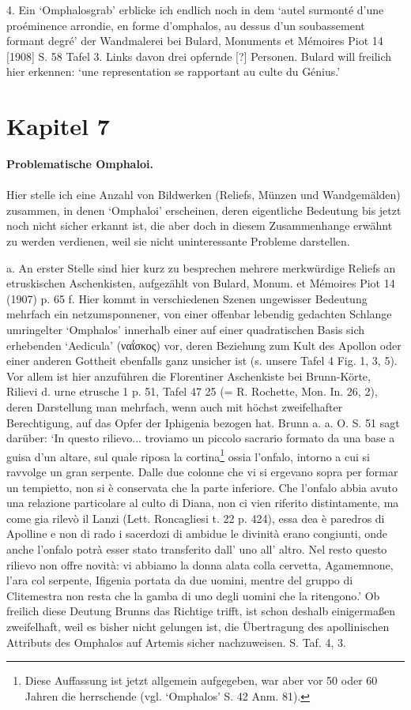\documentclass[a4paper, 11pt, oneside]{article}
\begin{document}
4. Ein `Omphalosgrab' erblicke ich endlich noch in dem `autel surmonté d'une proéminence arrondie, en forme d'omphalos, au dessus d'un soubassement formant degré' der Wandmalerei bei Bulard, Monuments et Mémoires Piot 14 [1908] S. 58 Tafel 3. Links davon drei opfernde [?] Personen. Bulard will freilich hier erkennen: `une representation se rapportant au culte du Génius.'
\clearpage
\section{Kapitel 7}
\begin{center}
\textbf{Problematische Omphaloi.}
\end{center}
\paragraph{}
Hier stelle ich eine Anzahl von Bildwerken (Reliefs, Münzen und Wandgemälden) zusammen, in denen `Omphaloi' erscheinen, deren eigentliche Bedeutung bis jetzt noch nicht sicher erkannt ist, die aber doch in diesem Zusammenhange erwähnt zu werden verdienen, weil sie nicht uninteressante Probleme darstellen.

a. An erster Stelle sind hier kurz zu besprechen mehrere merkwürdige Reliefs an etruskischen Aschenkisten, aufgezählt von Bulard, Monum. et Mémoires Piot 14 (1907) p. 65 f. Hier kommt in verschiedenen Szenen ungewisser Bedeutung mehrfach ein netzumsponnener, von einer offenbar lebendig gedachten Schlange umringelter `Omphalos' innerhalb einer auf einer quadratischen Basis sich erhebenden `Aedicula' (ναΐσκος) vor, deren Beziehung zum Kult des Apollon oder einer anderen Gottheit ebenfalls ganz unsicher ist (s. unsere Tafel 4 Fig. 1, 3, 5). Vor allem ist hier anzuführen die Florentiner Aschenkiste bei Brunn-Körte, Rilievi d. urne etrusche 1 p. 51, Tafel 47 25 (= R. Rochette, Mon. In. 26, 2), deren Darstellung man mehrfach, wenn auch mit höchst zweifelhafter Berechtigung, auf das Opfer der Iphigenia bezogen hat. Brunn a. a. O. S. 51 sagt darüber: `In questo rilievo... troviamo un piccolo sacrario formato da una base a guisa d'un altare, sul quale riposa la cortina\footnote{Diese Auffassung ist jetzt allgemein aufgegeben, war aber vor 50 oder 60 Jahren die herrschende (vgl. `Omphalos' S. 42 Anm. 81).} ossia l'onfalo, intorno a cui si ravvolge un gran serpente. Dalle due colonne che vi si ergevano sopra per formar un tempietto, non si è conservata che la parte inferiore. Che l'onfalo abbia avuto una relazione particolare al culto di Diana, non ci vien riferito distintamente, ma come gia rilevò il Lanzi (Lett. Roncagliesi t. 22 p. 424), essa dea è paredros di Apolline e non di rado i sacerdozi di ambidue le divinità erano congiunti, onde anche l'onfalo potrà esser stato transferito dall' uno all' altro. Nel resto questo rilievo non offre novità: vi abbiamo la donna alata colla cervetta, Agamemnone, l'ara col serpente, Ifigenia portata da due uomini, mentre del gruppo di Clitemestra non resta che la gamba di uno degli uomini che la ritengono.' Ob freilich diese Deutung Brunns das Richtige trifft, ist schon deshalb einigermaßen zweifelhaft, weil es bisher nicht gelungen ist, die Übertragung des apollinischen Attributs des Omphalos auf Artemis sicher nachzuweisen. S. Taf. 4, 3.
\end{document}
